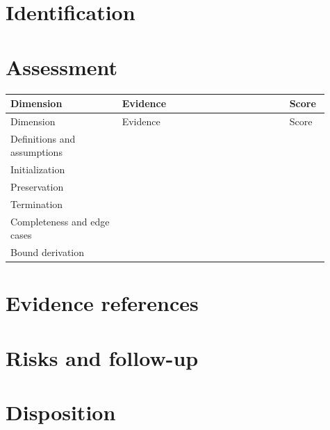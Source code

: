 \documentclass[11pt,letterpaper]{article}
\begin{document}
\tableofcontents
\clearpage
{}
\section{Identification}
\section{Assessment}
\small
\begin{longtable}{@{}p{0.32\linewidth}p{0.48\linewidth}p{0.11\linewidth}@{}}\toprule Dimension & Evidence & Score\\\midrule\endfirsthead\toprule Dimension & Evidence & Score\\\midrule\endhead
Definitions and assumptions & & \\[1.35em]
Initialization & & \\[1.35em]
Preservation & & \\[1.35em]
Termination & & \\[1.35em]
Completeness and edge cases & & \\[1.35em]
Bound derivation & & \\[1.35em]
\bottomrule\end{longtable}\normalsize
\section{Evidence references}
\section{Risks and follow-up}
\section{Disposition}
\end{document}
